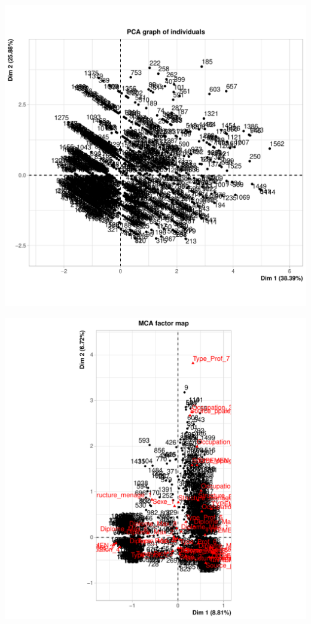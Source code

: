 \documentclass[11pt,a4paper, x11names]{article}\usepackage[]{graphicx}\usepackage[]{color}
\makeatletter
\def\maxwidth{ %
  \ifdim\Gin@nat@width>\linewidth
    \linewidth
  \else
    \Gin@nat@width
  \fi
}
\newenvironment{knitrout}{}{} %
\makeatother
\begin{document}
\begin{knitrout}
\includegraphics[width=\maxwidth]{figure/unnamed-chunk-13-4} 

\includegraphics[width=\maxwidth]{figure/unnamed-chunk-13-5} 
\end{knitrout}
\end{document}
